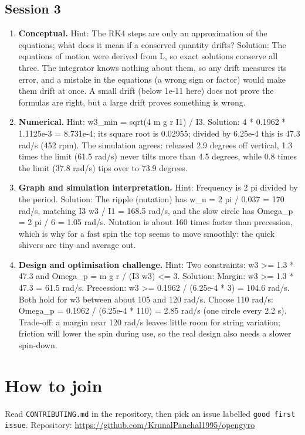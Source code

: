 \documentclass[11pt,a4paper]{article}
\begin{document}
\subsection*{Session 3}
\begin{enumerate}[nosep]
\item \textbf{Conceptual.} Hint: The RK4 steps are only an approximation of the equations; what does it mean if a conserved quantity drifts? Solution: The equations of motion were derived from L, so exact solutions conserve all three. The integrator knows nothing about them, so any drift measures its error, and a mistake in the equations (a wrong sign or factor) would make them drift at once. A small drift (below 1e-11 here) does not prove the formulas are right, but a large drift proves something is wrong.
\item \textbf{Numerical.} Hint: w3\_min = sqrt(4 m g r I1) / I3. Solution: 4 * 0.1962 * 1.1125e-3 = 8.731e-4; its square root is 0.02955; divided by 6.25e-4 this is 47.3 rad/s (452 rpm). The simulation agrees: released 2.9 degrees off vertical, 1.3 times the limit (61.5 rad/s) never tilts more than 4.5 degrees, while 0.8 times the limit (37.8 rad/s) tips over to 73.9 degrees.
\item \textbf{Graph and simulation interpretation.} Hint: Frequency is 2 pi divided by the period. Solution: The ripple (nutation) has w\_n = 2 pi / 0.037 = 170 rad/s, matching I3 w3 / I1 = 168.5 rad/s, and the slow circle has Omega\_p = 2 pi / 6 = 1.05 rad/s. Nutation is about 160 times faster than precession, which is why for a fast spin the top seems to move smoothly: the quick shivers are tiny and average out.
\item \textbf{Design and optimisation challenge.} Hint: Two constraints: w3 \textgreater{}= 1.3 * 47.3 and Omega\_p = m g r / (I3 w3) \textless{}= 3. Solution: Margin: w3 \textgreater{}= 1.3 * 47.3 = 61.5 rad/s. Precession: w3 \textgreater{}= 0.1962 / (6.25e-4 * 3) = 104.6 rad/s. Both hold for w3 between about 105 and 120 rad/s. Choose 110 rad/s: Omega\_p = 0.1962 / (6.25e-4 * 110) = 2.85 rad/s (one circle every 2.2 s). Trade-off: a margin near 120 rad/s leaves little room for string variation; friction will lower the spin during use, so the real design also needs a slower spin-down.
\end{enumerate}

\section{How to join}
Read \texttt{CONTRIBUTING.md} in the repository, then pick an issue labelled \texttt{good first issue}. Repository: \url{https://github.com/KrunalPanchal1995/opengyro}
\end{document}
